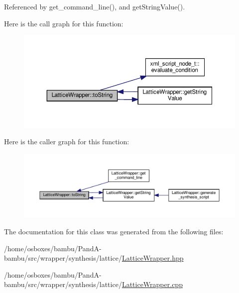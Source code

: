 Referenced by get\+\_\+command\+\_\+line(), and get\+String\+Value().

Here is the call graph for this function\+:
\nopagebreak
\begin{figure}[H]
\begin{center}
\leavevmode
\includegraphics[width=350pt]{d4/d55/classLatticeWrapper_a0c5cd7306773dc6c6e0250141f78760c_cgraph}
\end{center}
\end{figure}
Here is the caller graph for this function\+:
\nopagebreak
\begin{figure}[H]
\begin{center}
\leavevmode
\includegraphics[width=350pt]{d4/d55/classLatticeWrapper_a0c5cd7306773dc6c6e0250141f78760c_icgraph}
\end{center}
\end{figure}


The documentation for this class was generated from the following files\+:\begin{DoxyCompactItemize}
\item 
/home/osboxes/bambu/\+Pand\+A-\/bambu/src/wrapper/synthesis/lattice/\hyperlink{LatticeWrapper_8hpp}{Lattice\+Wrapper.\+hpp}\item 
/home/osboxes/bambu/\+Pand\+A-\/bambu/src/wrapper/synthesis/lattice/\hyperlink{LatticeWrapper_8cpp}{Lattice\+Wrapper.\+cpp}\end{DoxyCompactItemize}
